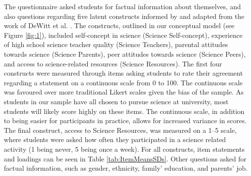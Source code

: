 \documentclass[smallextended]{svjour3}       %
\begin{document}
The questionnaire asked students for factual information about themselves, and also questions regarding five latent constructs informed by and adapted from the work of DeWitt et al. \citeyear{dewitt2011high}. The constructs, outlined in our conceptual model (see Figure \ref{fig:1}), included self-concept in science (Science Self-concept), experience of high school science teacher quality (Science Teachers), parental attitudes towards science (Science Parents), peer attitudes towards science (Science Peers), and access to science-related resources (Science Resources). The first four constructs were measured through items asking students to rate their agreement regarding a statement on a continuous scale from 0 to 100. The continuous scale was favoured over more traditional Likert scales given the bias of the sample. As students in our sample have all chosen to pursue science at university, most students will likely score highly on these items. The continuous scale, in addition to being easier for participants in practice, allows for increased variance in scores. The final construct, access to Science Resources, was measured on a 1--5 scale, where students were asked how often they participated in a science related activity (1 being never, 5 being once a week). For all constructs, item statements and loadings can be seen in Table \ref{tab:ItemMeansSDs}. Other questions asked for factual information, such as gender, ethnicity, family’ education, and parents' job. 
\end{document}
